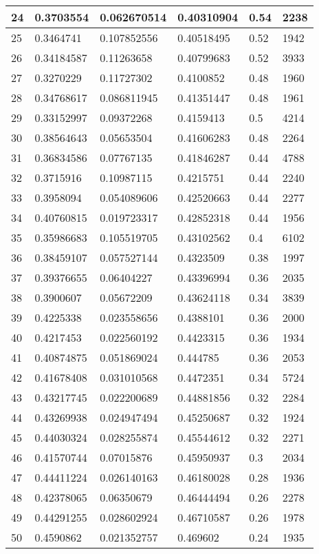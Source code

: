 \begin{longtable}{|l|l|l|l|l|l|}
24 & 0.3703554 & 0.062670514 & 0.40310904 & 0.54 & 2238 \\ \hline 
25 & 0.3464741 & 0.107852556 & 0.40518495 & 0.52 & 1942 \\ \hline 
26 & 0.34184587 & 0.11263658 & 0.40799683 & 0.52 & 3933 \\ \hline 
27 & 0.3270229 & 0.11727302 & 0.4100852 & 0.48 & 1960 \\ \hline 
28 & 0.34768617 & 0.086811945 & 0.41351447 & 0.48 & 1961 \\ \hline 
29 & 0.33152997 & 0.09372268 & 0.4159413 & 0.5 & 4214 \\ \hline 
30 & 0.38564643 & 0.05653504 & 0.41606283 & 0.48 & 2264 \\ \hline 
31 & 0.36834586 & 0.07767135 & 0.41846287 & 0.44 & 4788 \\ \hline 
32 & 0.3715916 & 0.10987115 & 0.4215751 & 0.44 & 2240 \\ \hline 
33 & 0.3958094 & 0.054089606 & 0.42520663 & 0.44 & 2277 \\ \hline 
34 & 0.40760815 & 0.019723317 & 0.42852318 & 0.44 & 1956 \\ \hline 
35 & 0.35986683 & 0.105519705 & 0.43102562 & 0.4 & 6102 \\ \hline 
36 & 0.38459107 & 0.057527144 & 0.4323509 & 0.38 & 1997 \\ \hline 
37 & 0.39376655 & 0.06404227 & 0.43396994 & 0.36 & 2035 \\ \hline 
38 & 0.3900607 & 0.05672209 & 0.43624118 & 0.34 & 3839 \\ \hline 
39 & 0.4225338 & 0.023558656 & 0.4388101 & 0.36 & 2000 \\ \hline 
40 & 0.4217453 & 0.022560192 & 0.4423315 & 0.36 & 1934 \\ \hline 
41 & 0.40874875 & 0.051869024 & 0.444785 & 0.36 & 2053 \\ \hline 
42 & 0.41678408 & 0.031010568 & 0.4472351 & 0.34 & 5724 \\ \hline 
43 & 0.43217745 & 0.022200689 & 0.44881856 & 0.32 & 2284 \\ \hline 
44 & 0.43269938 & 0.024947494 & 0.45250687 & 0.32 & 1924 \\ \hline 
45 & 0.44030324 & 0.028255874 & 0.45544612 & 0.32 & 2271 \\ \hline 
46 & 0.41570744 & 0.07015876 & 0.45950937 & 0.3 & 2034 \\ \hline 
47 & 0.44411224 & 0.026140163 & 0.46180028 & 0.28 & 1936 \\ \hline 
48 & 0.42378065 & 0.06350679 & 0.46444494 & 0.26 & 2278 \\ \hline 
49 & 0.44291255 & 0.028602924 & 0.46710587 & 0.26 & 1978 \\ \hline 
50 & 0.4590862 & 0.021352757 & 0.469602 & 0.24 & 1935 \\ \hline 
\end{longtable}